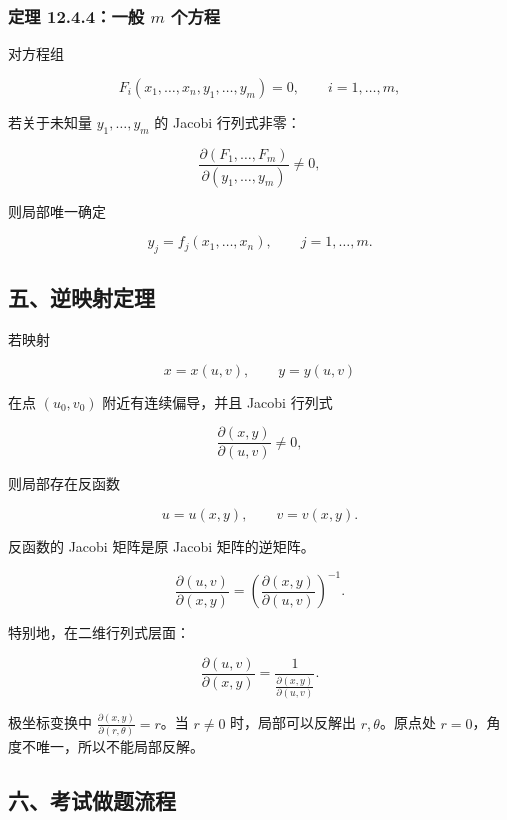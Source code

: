 \subsubsection*{定理 12.4.4：一般 \(m\) 个方程}

对方程组

\[
      F_i(x_1,\ldots,x_n,y_1,\ldots,y_m)=0,\qquad i=1,\ldots,m,
    \]

若关于未知量 \(y_1,\ldots,y_m\) 的 Jacobi 行列式非零：

\[
      \frac{\partial(F_1,\ldots,F_m)}{\partial(y_1,\ldots,y_m)}\ne0,
    \]

则局部唯一确定

\[
      y_j=f_j(x_1,\ldots,x_n),\qquad j=1,\ldots,m.
    \]

\subsection*{五、逆映射定理}

若映射

\[
      x=x(u,v),\qquad y=y(u,v)
    \]

在点 \((u_0,v_0)\) 附近有连续偏导，并且 Jacobi 行列式

\[
      \frac{\partial(x,y)}{\partial(u,v)}\ne0,
    \]

则局部存在反函数

\[
      u=u(x,y),\qquad v=v(x,y).
    \]

反函数的 Jacobi 矩阵是原 Jacobi 矩阵的逆矩阵。

\[
      \frac{\partial(u,v)}{\partial(x,y)}
      =
      \left(
      \frac{\partial(x,y)}{\partial(u,v)}
      \right)^{-1}.
    \]

特别地，在二维行列式层面：

\[
      \frac{\partial(u,v)}{\partial(x,y)}
      =
      \frac{1}{\frac{\partial(x,y)}{\partial(u,v)}}.
    \]

\begin{notebox}
极坐标变换中 \(\frac{\partial(x,y)}{\partial(r,\theta)}=r\)。当 \(r\ne0\) 时，局部可以反解出 \(r,\theta\)。原点处 \(r=0\)，角度不唯一，所以不能局部反解。
\end{notebox}

\subsection*{六、考试做题流程}

